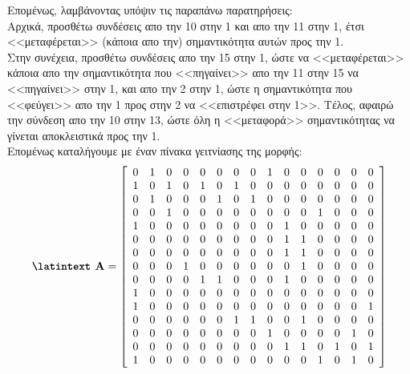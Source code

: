 \documentclass[a4paper,11pt]{article}
\newcommand{\lt}{\latintext}
\begin{document}
\par
Επομένως, λαμβάνοντας υπόψιν τις παραπάνω παρατηρήσεις:\\
Αρχικά, προσθέτω συνδέσεις απο την 10 στην 1 και απο την 11 στην 1, έτσι <<μεταφέρεται>> (κάποια απο την) σημαντικότητα αυτών προς την 1.\\
Στην συνέχεια, προσθέτω συνδέσεις απο την 15 στην 1, ώστε να <<μεταφέρεται>> κάποια απο την σημαντικότητα που <<πηγαίνει>> απο την 11 στην 15 να <<πηγαίνει>> στην 1, και απο την 2 στην 1, ώστε η σημαντικότητα που <<φεύγει>> απο την 1 προς στην 2 να <<επιστρέφει στην 1>>.
Τέλος, αφαιρώ την σύνδεση απο την 10 στην 13, ώστε όλη η <<μεταφορά>> σημαντικότητας να γίνεται αποκλειστικά προς την 1.\\

Επομένως καταλήγουμε με έναν πίνακα γειτνίασης της μορφής:\\

\[\textbf{{\lt A}}=
    \left[ \begin{array}{ccccccccccccccc}
    0 & 1 & 0 & 0 & 0 & 0 & 0 & 0 & 1 & 0 & 0 & 0 & 0 & 0 & 0 \\
    1 & 0 & 1 & 0 & 1 & 0 & 1 & 0 & 0 & 0 & 0 & 0 & 0 & 0 & 0 \\
    0 & 1 & 0 & 0 & 0 & 1 & 0 & 1 & 0 & 0 & 0 & 0 & 0 & 0 & 0 \\
    0 & 0 & 1 & 0 & 0 & 0 & 0 & 0 & 0 & 0 & 0 & 1 & 0 & 0 & 0 \\
    1 & 0 & 0 & 0 & 0 & 0 & 0 & 0 & 0 & 1 & 0 & 0 & 0 & 0 & 0 \\
    0 & 0 & 0 & 0 & 0 & 0 & 0 & 0 & 0 & 1 & 1 & 0 & 0 & 0 & 0 \\
    0 & 0 & 0 & 0 & 0 & 0 & 0 & 0 & 0 & 1 & 1 & 0 & 0 & 0 & 0 \\
    0 & 0 & 0 & 1 & 0 & 0 & 0 & 0 & 0 & 0 & 1 & 0 & 0 & 0 & 0 \\
    0 & 0 & 0 & 0 & 1 & 1 & 0 & 0 & 0 & 1 & 0 & 0 & 0 & 0 & 0 \\
    1 & 0 & 0 & 0 & 0 & 0 & 0 & 0 & 0 & 0 & 0 & 0 & 0 & 0 & 0 \\
    1 & 0 & 0 & 0 & 0 & 0 & 0 & 0 & 0 & 0 & 0 & 0 & 0 & 0 & 1 \\
    0 & 0 & 0 & 0 & 0 & 0 & 1 & 1 & 0 & 0 & 1 & 0 & 0 & 0 & 0 \\
    0 & 0 & 0 & 0 & 0 & 0 & 0 & 0 & 1 & 0 & 0 & 0 & 0 & 1 & 0 \\
    0 & 0 & 0 & 0 & 0 & 0 & 0 & 0 & 0 & 1 & 1 & 0 & 1 & 0 & 1 \\
    1 & 0 & 0 & 0 & 0 & 0 & 0 & 0 & 0 & 0 & 0 & 1 & 0 & 1 & 0
    \end{array} \right]
\]
\end{document}
